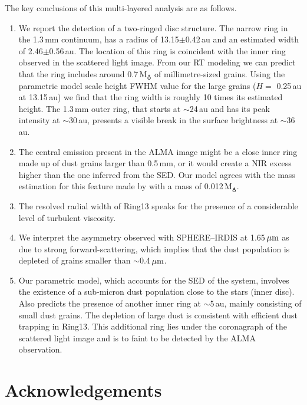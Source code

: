\documentclass[fleqn,usenatbib,useAMS]{mnras}
\begin{document}
The key conclusions of this multi-layered analysis are as follows.
\begin{enumerate}
  \item We report the detection of a two-ringed disc structure. The narrow ring in the 1.3\,mm continuum, has a radius of 13.15$\pm$0.42\,au and an estimated width of 2.46$\pm$0.56\,au. The location of this ring is coincident with the inner ring observed in the scattered light image. From our RT modeling we can predict that the ring includes around 0.7\,M$_{\earth}$ of millimetre-sized grains. Using the parametric model scale height FWHM value for the large grains ($H=$ 0.25\,au at 13.15\,au) we find that the ring width is roughly 10 times its estimated height. The 1.3\,mm outer ring, that starts at $\sim$24\,au and has its peak intensity at $\sim$30\,au, presents a visible break in the surface brightness at $\sim$36\,au.
  
  \item The central emission present in the ALMA image might be a close inner ring made up of dust grains larger than 0.5\,mm, or it would create a NIR excess higher than the one inferred from the SED. Our model agrees with the mass estimation for this feature made by \citet{Francis_2020} with a mass of 0.012\,M$_{\earth}$. 
  
  \item The resolved radial width of Ring13 speaks for the presence of a considerable level of turbulent viscosity.

  \item We interpret the asymmetry observed with SPHERE--IRDIS at 1.65\,$\hbox{$\mu$m}$ as due to strong forward-scattering, which implies that the dust population is depleted of grains smaller than $\sim$0.4\,$\hbox{$\mu$m}$.
  
  \item Our parametric model, which accounts for the SED of the system, involves the existence of a sub-micron dust population close to the stars (inner disc). Also predicts the presence of another inner ring at $\sim$5\,au, mainly consisting of small dust grains. The depletion of large dust is consistent with efficient dust trapping in Ring13. This additional ring lies under the coronagraph of the scattered light image and is to faint to be detected by the ALMA observation.
\end{enumerate}



\section*{Acknowledgements}
\end{document}
